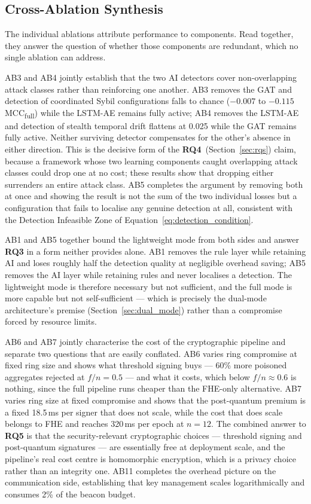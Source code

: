\documentclass[12pt, a4paper]{report}
\begin{document}
\subsection{Cross-Ablation Synthesis}

The individual ablations attribute performance to components. Read
together, they answer the question of whether those components are
redundant, which no single ablation can address.

AB3 and AB4 jointly establish that the two AI detectors cover
non-overlapping attack classes rather than reinforcing one another. AB3
removes the GAT and detection of coordinated Sybil configurations falls
to chance ($-0.007$ to $-0.115$ MCC\textsubscript{full}) while the
LSTM-AE remains fully active; AB4 removes the LSTM-AE and detection of
stealth temporal drift flattens at 0.025 while the GAT remains fully
active. Neither surviving detector compensates for the other's absence
in either direction. This is the decisive form of the
\textbf{RQ4}~(Section~\ref{sec:rqs}) claim, because a framework whose
two learning components caught overlapping attack classes could drop one
at no cost; these results show that dropping either surrenders an entire
attack class. AB5 completes the argument by removing both at once and
showing the result is not the sum of the two individual losses but a
configuration that fails to localise any genuine detection at all,
consistent with the Detection Infeasible Zone of
Equation~\ref{eq:detection_condition}.

AB1 and AB5 together bound the lightweight mode from both sides and
answer \textbf{RQ3} in a form neither provides alone. AB1 removes the
rule layer while retaining AI and loses roughly half the detection
quality at negligible overhead saving; AB5 removes the AI layer while
retaining rules and never localises a detection. The lightweight mode is
therefore necessary but not sufficient, and the full mode is more
capable but not self-sufficient --- which is precisely the dual-mode
architecture's premise (Section~\ref{sec:dual_mode}) rather than a
compromise forced by resource limits.

AB6 and AB7 jointly characterise the cost of the cryptographic pipeline
and separate two questions that are easily conflated. AB6 varies ring
compromise at fixed ring size and shows what threshold signing buys ---
60\% more poisoned aggregates rejected at $f/n = 0.5$ --- and what it
costs, which below $f/n \approx 0.6$ is nothing, since the full pipeline
runs cheaper than the FHE-only alternative. AB7 varies ring size at
fixed compromise and shows that the post-quantum premium is a fixed
18.5\,ms per signer that does not scale, while the cost that does scale
belongs to FHE and reaches 320\,ms per epoch at $n = 12$. The combined
answer to \textbf{RQ5} is that the security-relevant cryptographic
choices --- threshold signing and post-quantum signatures --- are
essentially free at deployment scale, and the pipeline's real cost
centre is homomorphic encryption, which is a privacy choice rather than
an integrity one. AB11 completes the overhead picture on the
communication side, establishing that key management scales
logarithmically and consumes 2\% of the beacon budget.
\end{document}
